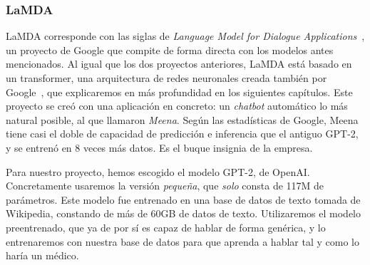 \subsubsection{LaMDA}
LaMDA corresponde con las siglas de \textit{Language Model for Dialogue Applications}~\cite{LaMDAGoogle2020}, un proyecto de Google que compite de forma directa con los modelos antes mencionados. Al igual que los dos proyectos anteriores, LaMDA está basado en un transformer, una arquitectura de redes neuronales creada también por Google~\cite{TransformerAshish2017}, que explicaremos en más profundidad en los siguientes capítulos. Este proyecto se creó con una aplicación en concreto: un \textit{chatbot} automático lo más natural posible, al que llamaron \textit{Meena}. Según las estadísticas de Google, Meena tiene casi el doble de capacidad de predicción e inferencia que el antiguo GPT-2, y se entrenó en 8 veces más datos. Es el buque insignia de la empresa.


Para nuestro proyecto, hemos escogido el modelo GPT-2, de OpenAI. Concretamente usaremos la versión \textit{pequeña}, que \textit{solo} consta de 117M de parámetros. Este modelo fue entrenado en una base de datos de texto tomada de Wikipedia, constando de más de 60GB de datos de texto. Utilizaremos el modelo preentrenado, que ya de por sí es capaz de hablar de forma genérica, y lo entrenaremos con nuestra base de datos para que aprenda a hablar tal y como lo haría un médico.



